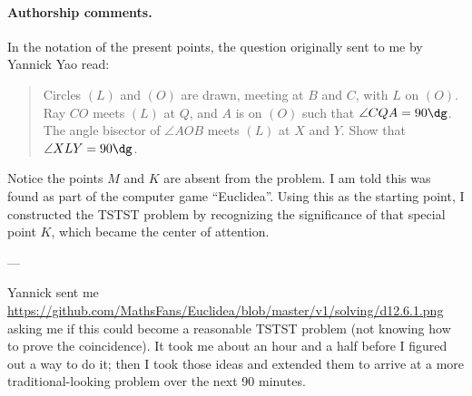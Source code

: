 \paragraph{Authorship comments.}
In the notation of the present points,
the question originally sent to me by Yannick Yao read:
\begin{quote}
  Circles $(L)$ and $(O)$ are drawn,
  meeting at $B$ and $C$, with $L$ on $(O)$.
  Ray $CO$ meets $(L)$ at $Q$,
  and $A$ is on $(O)$ such that $\angle CQA = 90\dg$.
  The angle bisector of $\angle AOB$ meets $(L)$ at $X$ and $Y$.
  Show that $\angle XLY = 90\dg$.
\end{quote}
Notice the points $M$ and $K$ are absent from the problem.
I am told this was found as part of the computer game ``Euclidea''.
Using this as the starting point,
I constructed the TSTST problem by recognizing the significance
of that special point $K$, which became the center of attention.

---

Yannick sent me
\url{https://github.com/MathsFans/Euclidea/blob/master/v1/solving/d12.6.1.png}
asking me if this could become a reasonable TSTST problem
(not knowing how to prove the coincidence).
It took me about an hour and a half before I figured out a way to do it;
then I took those ideas and extended them to arrive at a
more traditional-looking problem over the next 90 minutes.

